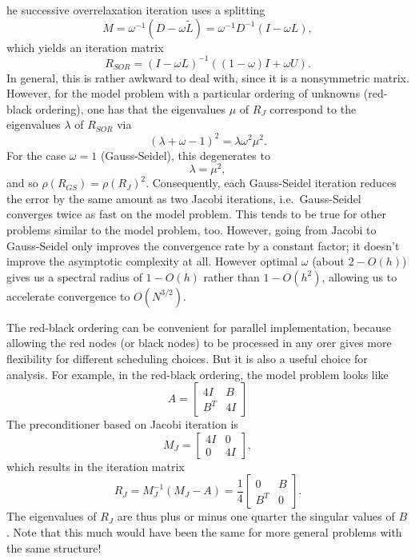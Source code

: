 \documentclass[12pt, leqno]{article} %
\begin{document}
he successive overrelaxation iteration uses a splitting
\[
  M = \omega^{-1} (D - \omega \tilde{L}) = \omega^{-1} D^{-1} (I-\omega L),
\]
which yields an iteration matrix
\[
  R_{SOR} = (I-\omega L)^{-1} ( (1-\omega) I + \omega U).
\]
In general, this is rather awkward to deal with, since it is a
nonsymmetric matrix.  However, for the model problem with a particular
ordering of unknowns (red-black ordering), one has that the
eigenvalues $\mu$ of $R_{J}$ correspond to the eigenvalues $\lambda$
of $R_{SOR}$ via
\[
  (\lambda + \omega - 1)^2 = \lambda \omega^2 \mu^2.
\]
For the case $\omega = 1$ (Gauss-Seidel), this degenerates to
\[
  \lambda = \mu^2,
\]
and so $\rho(R_{GS}) = \rho(R_J)^2$.  Consequently, each Gauss-Seidel
iteration reduces the error by the same amount as two Jacobi
iterations, i.e.~Gauss-Seidel converges twice as fast on the model
problem.  This tends to be true for other problems similar to the
model problem, too.  However, going from Jacobi to Gauss-Seidel only
improves the convergence rate by a constant factor; it doesn't improve
the asymptotic complexity at all.  However optimal $\omega$ (about $2 -
O(h)$) gives us a spectral radius of $1-O(h)$ rather than $1-O(h^2)$,
allowing us to accelerate convergence to $O(N^{3/2})$.

The red-black ordering can be convenient for parallel implementation,
because allowing the red nodes (or black nodes) to be processed in any
orer gives more flexibility for different scheduling choices.  But it
is also a useful choice for analysis.  For example, in the red-black
ordering, the model problem looks like
\[
  A = \begin{bmatrix} 4I & B \\ B^T & 4I \end{bmatrix}
\]
The preconditioner based on Jacobi iteration is
\[
  M_J = \begin{bmatrix} 4I & 0 \\ 0 & 4 I \end{bmatrix},
\]
which results in the iteration matrix
\[
  R_J = M_J^{-1} (M_J-A) =
  \frac{1}{4} \begin{bmatrix} 0 & B \\ B^T & 0 \end{bmatrix}.
\]
The eigenvalues of $R_J$ are thus plus or minus one quarter the
singular values of $B$.  Note that this much would have been the same
for more general problems with the same structure!
\end{document}
